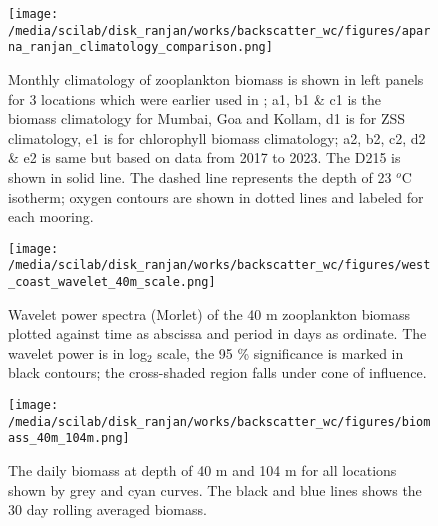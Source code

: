 \documentclass{article}
\begin{document}
\begin{figure}[htbp]
	\centering
	\texttt{[image: /media/scilab/disk\_ranjan/works/backscatter\_wc/figures/aparna\_ranjan\_climatology\_comparison.png]} 
	\captionsetup{justification=justified,font=footnotesize,skip=0.05\baselineskip,width=\textwidth}
	\caption{Monthly climatology of zooplankton biomass is shown in left panels for 3 locations which were earlier used in \citep{aparna2022seasonal}; a1, b1 \& c1 is the biomass climatology for Mumbai, Goa and Kollam, d1 is for ZSS climatology, e1 is for chlorophyll biomass climatology; a2, b2, c2, d2 \& e2 is same but based on data from 2017 to 2023. The D215 is shown in solid line. The dashed line represents the depth of 23 $^o$C isotherm; oxygen contours are shown in dotted lines and labeled for each mooring.}
	\label{fig:fig5}
\end{figure}


\begin{figure}[htbp]
	\centering
	\texttt{[image: /media/scilab/disk\_ranjan/works/backscatter\_wc/figures/west\_coast\_wavelet\_40m\_scale.png]} 
	\captionsetup{justification=justified,font=footnotesize,skip=0.05\baselineskip,width=\textwidth}
	\caption{Wavelet power spectra (Morlet) of the 40 m zooplankton biomass plotted against time as abscissa and period in days as ordinate. The wavelet power is in log$_2$ scale, the 95 \% significance is marked in black contours; the cross-shaded region falls under cone of influence.}
	\label{fig:fig6}
\end{figure}

\begin{figure}[htbp]
	\centering
	\texttt{[image: /media/scilab/disk\_ranjan/works/backscatter\_wc/figures/biomass\_40m\_104m.png]} 
	\captionsetup{justification=justified,font=footnotesize,skip=0.05\baselineskip,width=\textwidth}
	\caption{The daily biomass at depth of 40 m and 104 m for all locations shown by grey and cyan curves. The black and blue lines shows the 30 day rolling averaged biomass. }
	\label{fig:fig7}
\end{figure}
\end{document}
